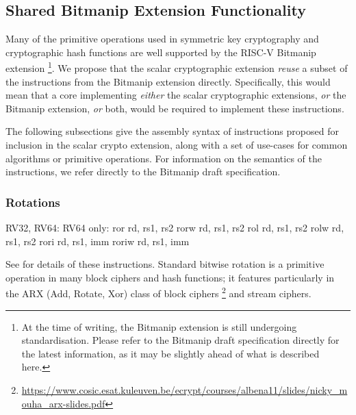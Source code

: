 

\subsection{Shared Bitmanip Extension Functionality}
\label{sec:scalar:bitmanip}

Many of the primitive operations used in symmetric key cryptography
and cryptographic hash functions are well supported by the
RISC-V Bitmanip \cite{riscv:bitmanip:repo} extension
\footnote{
At the time of writing, the Bitmanip extension is still undergoing
standardisation.
Please refer to the Bitmanip draft specification
\cite{riscv:bitmanip:draft}
directly for the
latest information, as it may be slightly ahead of what is described
here.
}.
We propose that the scalar cryptographic extension {\em reuse} a
subset of the instructions from the Bitmanip extension directly.
Specifically, this would mean that
a core implementing
{\em either}
the scalar cryptographic extensions,
{\em or}
the Bitmanip extension,
{\em or}
both,
would be required to implement these instructions.

%
%

The following subsections give the assembly syntax of instructions
proposed for inclusion in the scalar crypto extension, along with a
set of use-cases for common algorithms or primitive operations.
For information on the semantics of the instructions, we refer directly
to the Bitmanip draft specification.

\subsubsection{Rotations}
\label{sec:scalar:bitmanip:rotate}

\begin{cryptobitmanipisa}
RV32, RV64:                         RV64 only:
    ror    rd, rs1, rs2                 rorw   rd, rs1, rs2
    rol    rd, rs1, rs2                 rolw   rd, rs1, rs2
    rori   rd, rs1, imm                 roriw  rd, rs1, imm
\end{cryptobitmanipisa}

See \cite[Section 3.1.1]{riscv:bitmanip:draft} for details of
these instructions.
Standard bitwise rotation is a primitive operation in many block ciphers and
hash functions;
it features particularly in the ARX (Add, Rotate, Xor) class of
block ciphers
\footnote{\url{https://www.cosic.esat.kuleuven.be/ecrypt/courses/albena11/slides/nicky_mouha_arx-slides.pdf}}
and stream ciphers.

